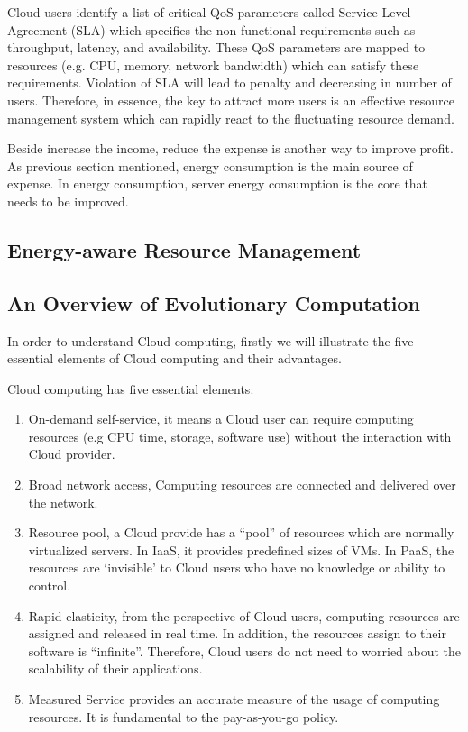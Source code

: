  Cloud users identify a list of critical QoS parameters called Service Level Agreement (SLA) which specifies the non-functional requirements such as throughput, latency, and availability. These QoS parameters are mapped to resources (e.g. CPU, memory, network bandwidth) which can satisfy these requirements. Violation of SLA will lead to penalty and decreasing in number of users. Therefore, in essence, the key to attract more users is an effective resource management system which can rapidly react to the fluctuating resource demand. 

Beside increase the income, reduce the expense is another way to improve profit. As previous section mentioned, energy consumption is the main source of expense. In energy consumption, server energy consumption is the core that needs to be improved. 

\subsection{Energy-aware Resource Management}
\subsection{An Overview of Evolutionary Computation}


In order to understand Cloud computing, firstly we will illustrate the five essential elements of Cloud computing and their advantages.

Cloud computing has five essential elements:
\begin{enumerate}
 \item On-demand self-service, it means a Cloud user can require computing resources (e.g CPU time, storage, software use) without the interaction with Cloud provider.
 \item Broad network access, Computing resources are connected and delivered over the network.
 \item Resource pool, a Cloud provide has a ``pool'' of resources which are normally virtualized servers. In IaaS, it provides predefined sizes of VMs. In PaaS, the resources are `invisible' to Cloud users who have no knowledge or ability to control. 
 \item Rapid elasticity, from the perspective of Cloud users, computing resources are assigned and released in
real time. In addition, the resources assign to their software is ``infinite''. Therefore, Cloud users do not need to worried about the scalability of their applications.
 \item Measured Service provides an accurate measure of the usage of computing resources. It is fundamental to the pay-as-you-go policy.
\end{enumerate}

